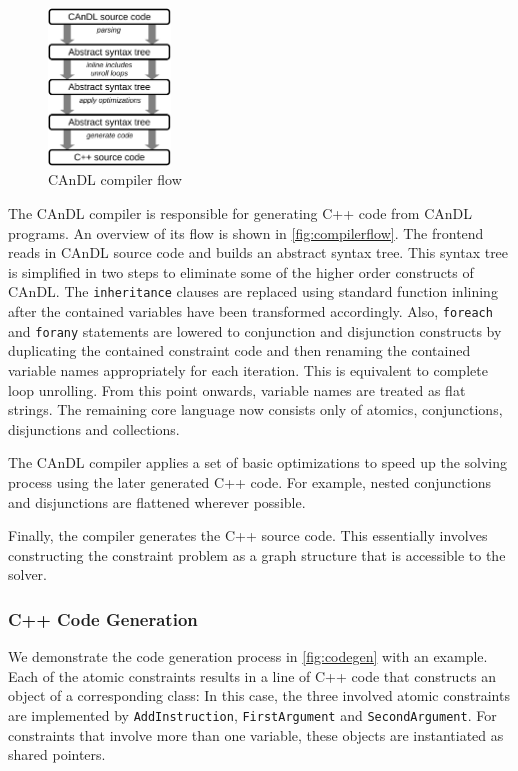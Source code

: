 \begin{figure}[t]
\centering
\includegraphics[width=0.29\textwidth]{figures/compilerFlow.pdf}
\caption{CAnDL compiler flow}
\label{fig:compilerflow}
\end{figure}

    The CAnDL compiler is responsible for generating C++ code from CAnDL
    programs.
    An overview of its  flow is shown in \autoref{fig:compilerflow}.
    The frontend reads in  CAnDL source code and builds an abstract syntax tree.
    This syntax tree is simplified in two steps to eliminate some of the higher
    order constructs of CAnDL.
    The \texttt{inheritance} clauses are replaced using standard function
    inlining after the contained variables have been transformed accordingly.
    Also, \texttt{foreach} and \texttt{forany} statements are lowered to
    conjunction and disjunction constructs by duplicating the contained constraint code
    and then renaming the contained variable names appropriately for each
    iteration. This is equivalent to complete loop unrolling.
    From this point onwards, variable names are treated as flat strings.
    The remaining core language now consists only of atomics, conjunctions,
    disjunctions and collections.

    The CAnDL compiler applies a set of basic optimizations to speed up the
    solving process using the later generated C++ code.
    For example, nested conjunctions and disjunctions are flattened wherever
    possible.

    Finally, the compiler generates the C++ source code.
    This essentially involves constructing the constraint problem as a graph
    structure that is accessible to the solver.

\subsubsection{C++ Code Generation}

    We demonstrate the code generation process in \autoref{fig:codegen} with an
    example.
    Each of the atomic constraints results in a line of C++ code that constructs
    an object of a corresponding class:
    In this case, the three involved atomic constraints are implemented by
    \texttt{AddInstruction}, \texttt{FirstArgument} and \texttt{SecondArgument}.
    For constraints that involve more than one variable, these objects are
    instantiated as shared pointers.

